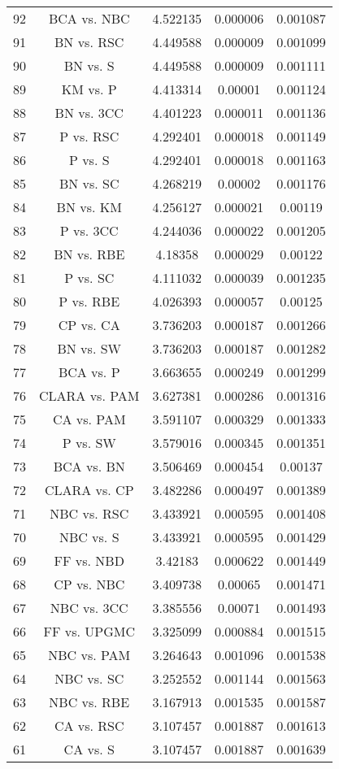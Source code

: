 \documentclass[a4paper,10pt]{article}
\begin{document}
\begin{landscape}
\begin{table}[!htp]
\begin{tabular}{ccccc}
92&BCA vs. NBC&4.522135&0.000006&0.001087\\
91&BN vs. RSC&4.449588&0.000009&0.001099\\
90&BN vs. S&4.449588&0.000009&0.001111\\
89&KM vs. P&4.413314&0.00001&0.001124\\
88&BN vs. 3CC&4.401223&0.000011&0.001136\\
87&P vs. RSC&4.292401&0.000018&0.001149\\
86&P vs. S&4.292401&0.000018&0.001163\\
85&BN vs. SC&4.268219&0.00002&0.001176\\
84&BN vs. KM&4.256127&0.000021&0.00119\\
83&P vs. 3CC&4.244036&0.000022&0.001205\\
82&BN vs. RBE&4.18358&0.000029&0.00122\\
81&P vs. SC&4.111032&0.000039&0.001235\\
80&P vs. RBE&4.026393&0.000057&0.00125\\
79&CP vs. CA&3.736203&0.000187&0.001266\\
78&BN vs. SW&3.736203&0.000187&0.001282\\
77&BCA vs. P&3.663655&0.000249&0.001299\\
76&CLARA vs. PAM&3.627381&0.000286&0.001316\\
75&CA vs. PAM&3.591107&0.000329&0.001333\\
74&P vs. SW&3.579016&0.000345&0.001351\\
73&BCA vs. BN&3.506469&0.000454&0.00137\\
72&CLARA vs. CP&3.482286&0.000497&0.001389\\
71&NBC vs. RSC&3.433921&0.000595&0.001408\\
70&NBC vs. S&3.433921&0.000595&0.001429\\
69&FF vs. NBD&3.42183&0.000622&0.001449\\
68&CP vs. NBC&3.409738&0.00065&0.001471\\
67&NBC vs. 3CC&3.385556&0.00071&0.001493\\
66&FF vs. UPGMC&3.325099&0.000884&0.001515\\
65&NBC vs. PAM&3.264643&0.001096&0.001538\\
64&NBC vs. SC&3.252552&0.001144&0.001563\\
63&NBC vs. RBE&3.167913&0.001535&0.001587\\
62&CA vs. RSC&3.107457&0.001887&0.001613\\
61&CA vs. S&3.107457&0.001887&0.001639\\

\end{tabular}
\end{table}
\end{landscape}
\end{document}
